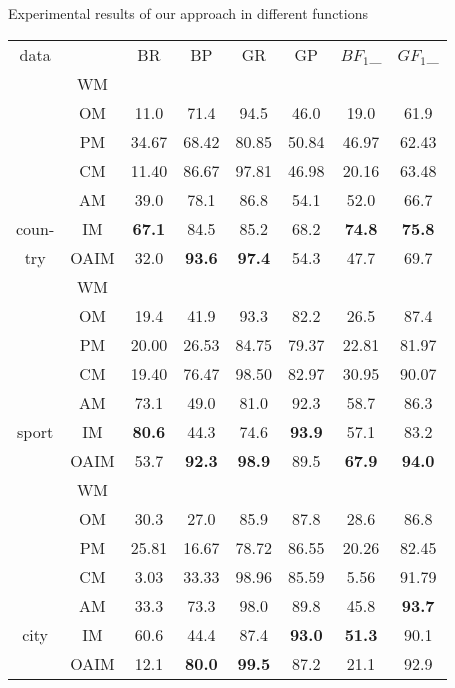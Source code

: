 {\makeatletter{}\makeatother
 \caption{Experimental results of our approach in different functions}{\scriptsize{\begin{tabular}{|c|c|c|c|c|c|c|c|} \hline
data& & BR & BP& GR&GP &$BF_{1}$\_&$GF_{1}$\_\\
        &WM \\\cline{2-8}
        &OM &11.0  &71.4  &94.5  &46.0  &19.0  &61.9\\\cline{2-8}
        &PM &34.67	&68.42	&80.85	&50.84	&46.97	&62.43\\\cline{2-8}
        &CM &11.40	&86.67	&97.81	&46.98	&20.16	&63.48\\\cline{2-8}
        &AM &39.0   &78.1   &86.8   &54.1   &52.0   &66.7\\\cline{2-8}
coun-   &IM &\textbf{67.1}  &84.5   &85.2   &68.2   &\textbf{74.8}  &\textbf{75.8}\\\cline{2-8}
try     &OAIM&32.0  &\textbf{93.6}  &\textbf{97.4}  &54.3   &47.7   &69.7\\\hline
&WM \\\cline{2-8}
        &OM &19.4  &41.9  &93.3  &82.2  &26.5  &87.4\\\cline{2-8}
        &PM &20.00	&26.53	&84.75	&79.37	&22.81	&81.97\\\cline{2-8}
        &CM &19.40	&76.47	&98.50	&82.97	&30.95	&90.07\\\cline{2-8}
        &AM &73.1   &49.0   &81.0   &92.3   &58.7   &86.3\\\cline{2-8}
sport   &IM &\textbf{80.6}  &44.3   &74.6   &\textbf{93.9}  &57.1   &83.2\\\cline{2-8}
       &OAIM    &53.7   &\textbf{92.3}  &\textbf{98.9}  &89.5   &\textbf{67.9}  &\textbf{94.0}\\\hline
       &WM \\\cline{2-8}
       &OM  &30.3  &27.0  &85.9  &87.8  &28.6  &86.8\\\cline{2-8}
       &PM &25.81	&16.67	&78.72	&86.55	&20.26	&82.45\\\cline{2-8}
        &CM &3.03	&33.33	&98.96	&85.59	&5.56	&91.79\\\cline{2-8}
       &AM  &33.3   &73.3   &98.0   &89.8   &45.8   &\textbf{93.7}\\\cline{2-8}
city    &IM &60.6   &44.4   &87.4   &\textbf{93.0}  &\textbf{51.3}  &90.1\\\cline{2-8}
       &OAIM    &12.1   &\textbf{80.0}  &\textbf{99.5}  &87.2   &21.1   &92.9\\\hline

\end{tabular}}}}
